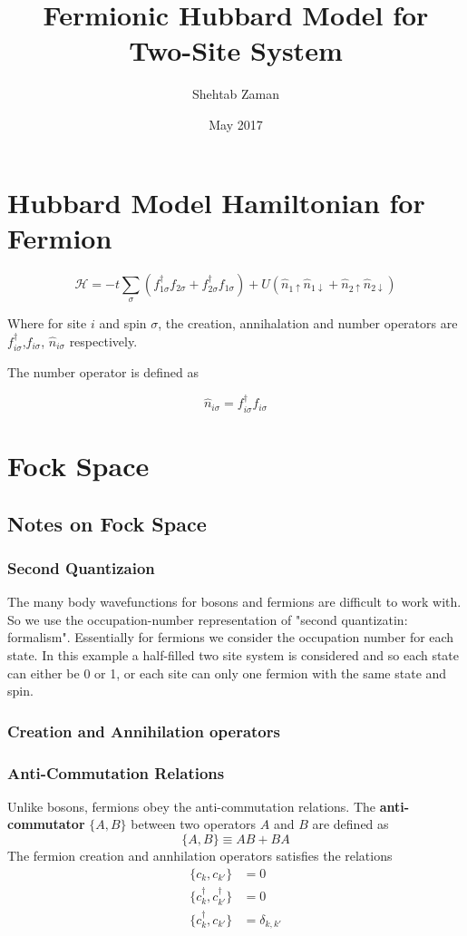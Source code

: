 \documentclass{article}
\title{Fermionic Hubbard Model for Two-Site System}
\author{Shehtab Zaman }
\date{May 2017}
\begin{document}
\maketitle
\section{Hubbard Model Hamiltonian for Fermion}

\begin{equation}
\mathcal{H} = -t\sum_{\sigma} \left(f_{1 \sigma} ^{\dagger}f_{2 \sigma}+f_{2 \sigma} ^{\dagger}f_{1 \sigma} \right)
+ U\left(\hat{n}_{1\uparrow} \hat{n}_{1\downarrow} + \hat{n}_{2\uparrow} \hat{n}_{2\downarrow} \right)
\end{equation}

Where for site $ i$ and spin $ \sigma$, the creation, annihalation and number
operators are $f_{i \sigma} ^{\dagger}$,$f_{i \sigma} $,
$ \hat{n}_{i\sigma}$  respectively.

The number operator is defined as

$$ \hat{n}_{i\sigma} = f_{i \sigma} ^{\dagger}f_{i \sigma}$$
\section{Fock Space}
\subsection{Notes on Fock Space}
\subsubsection{Second Quantizaion}
The many body wavefunctions for bosons and fermions are difficult to work
with. So we use the occupation-number representation of "second quantizatin: formalism".
Essentially for fermions we consider the occupation number for each state. In
this example a half-filled two site system is considered and so each state
can either be 0 or 1, or each site can only one fermion with the same state and spin.
\subsubsection{Creation and Annihilation operators}
\subsubsection{Anti-Commutation Relations}
Unlike bosons, fermions obey the anti-commutation relations. The \textbf{anti-commutator}
$\{A,B\} $ between two operators $ A$ and $ B$ are defined as
\begin{equation}
  \{A,B\}\equiv AB + BA
\end{equation}
The fermion creation and annhilation operators satisfies the relations
\begin{align}
  \{c_{k},c_{k\prime}\} &= 0 \\
  \{c^{\dagger}_{k},c^{\dagger}_{k\prime}\} &= 0 \\
  \{c^{\dagger}_{k},c_{k\prime}\} &= \delta_{k,k\prime}
\end{align}
\end{document}
